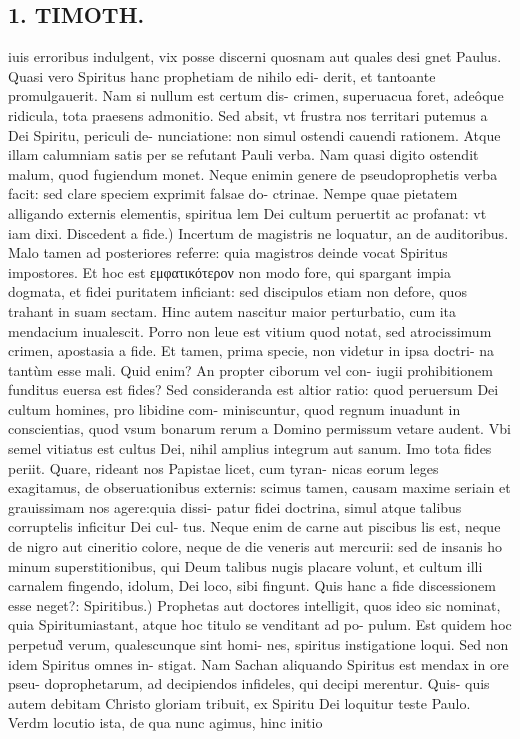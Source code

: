 \documentclass{article}
\begin{document}
\begin{pages}
\section*{1. TIMOTH. }
\marginpar{[ p.44 ]}\pstart iuis erroribus indulgent, vix posse discerni quosnam aut quales desi gnet Paulus. Quasi vero Spiritus hanc prophetiam de nihilo edi- derit, et tantoante promulgauerit. Nam si nullum est certum dis- crimen, superuacua foret, adeôque ridicula, tota praesens admonitio. Sed absit, vt frustra nos territari putemus a Dei Spiritu, periculi de- nunciatione: non simul ostendi cauendi rationem. Atque illam calumniam satis per se refutant Pauli verba. Nam quasi digito ostendit malum, quod fugiendum monet. Neque enimin genere de pseudoprophetis verba facit: sed clare speciem exprimit falsae do- ctrinae. Nempe quae pietatem alligando externis elementis, spiritua lem Dei cultum peruertit ac profanat: vt iam dixi.  \pend\pstart Discedent a fide.) Incertum de magistris ne loquatur, an de auditoribus. Malo tamen ad posteriores referre: quia magistros deinde vocat Spiritus impostores. Et hoc est εμφατικότερον non modo fore, qui spargant impia dogmata, et fidei puritatem inficiant: sed discipulos etiam non defore, quos trahant in suam sectam. Hinc autem nascitur maior perturbatio, cum ita mendacium inualescit. Porro non leue est vitium quod notat, sed atrocissimum crimen, apostasia a fide. Et tamen, prima specie, non videtur in ipsa doctri- na tantùm esse mali. Quid enim? An propter ciborum vel con- iugii prohibitionem funditus euersa est fides? Sed consideranda est altior ratio: quod peruersum Dei cultum homines, pro libidine com- miniscuntur, quod regnum inuadunt in conscientias, quod vsum bonarum rerum a Domino permissum vetare audent. Vbi semel vitiatus est cultus Dei, nihil amplius integrum aut sanum. Imo tota fides periit. Quare, rideant nos Papistae licet, cum tyran- nicas eorum leges exagitamus, de obseruationibus externis: scimus tamen, causam maxime seriain et grauissimam nos agere:quia dissi- patur fidei doctrina, simul atque talibus corruptelis inficitur Dei cul- tus. Neque enim de carne aut piscibus lis est, neque de nigro aut cineritio colore, neque de die veneris aut mercurii: sed de insanis ho minum superstitionibus, qui Deum talibus nugis placare volunt, et cultum illi carnalem fingendo, idolum, Dei loco, sibi fingunt. Quis hanc a fide discessionem esse neget?:  \pend\pstart Spiritibus.) Prophetas aut doctores intelligit, quos ideo sic nominat, quia Spiritumiastant, atque hoc titulo se venditant ad po- pulum. Est quidem hoc perpetud̀ verum, qualescunque sint homi- nes, spiritus instigatione loqui. Sed non idem Spiritus omnes in- stigat. Nam Sachan aliquando Spiritus est mendax in ore pseu- doprophetarum, ad decipiendos infideles, qui decipi merentur. Quis- quis autem debitam Christo gloriam tribuit, ex Spiritu Dei loquitur teste Paulo. Verdm locutio ista, de qua nunc agimus, hinc initio  \pend

\end{pages}
\end{document}
